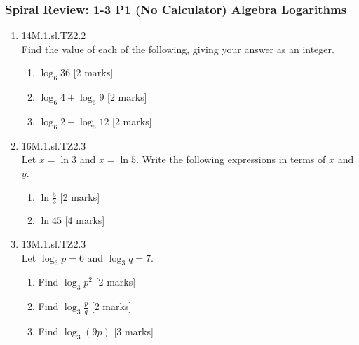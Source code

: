 \documentclass[12pt, twoside]{article}
\begin{document}
\subsubsection*{Spiral Review: 1-3 P1 (No Calculator) Algebra Logarithms}
 \begin{enumerate}

  \item 14M.1.sl.TZ2.2\\
  Find the value of each of the following, giving your answer as an integer.
  \begin{enumerate}
    \item $\log_6 36$ [2 marks]
    \item $\log_6 4 + \log_6 9$ [2 marks]
    \item $\log_6 2 - \log_6 12$ [2 marks]
  \end{enumerate}

  \item 16M.1.sl.TZ2.3\\
  Let $x=\ln 3$ and $x=\ln 5$. Write the following expressions in terms of $x$ and $y$.
  \begin{enumerate}
    \item $\ln \frac{5}{3}$ [2 marks]
    \item $\ln 45$ [4 marks]
  \end{enumerate}

  \item 13M.1.sl.TZ2.3\\
  Let $\log_3 p =6$ and $\log_3 q =7$.
  \begin{enumerate}
    \item Find $\log_3 p^2$ [2 marks]
    \item Find $\log_3 \frac{p}{q}$ [2 marks]
    \item Find $\log_3 (9p)$ [3 marks]
  \end{enumerate}


\end{enumerate}
\end{document}
